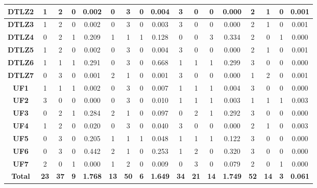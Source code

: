 \begin{table*}[t]
\begin{tabular}{c|c|c|c|c|c|c|c|c|c|c|c|c|c|c|c|c|}
\multicolumn{1}{|c|}{\textbf{DTLZ2}} & 1 & 2 & 0 & 0.002 & 0 & 3 & 0 & 0.004 & 3 & 0 & 0 & 0.000 & 2 & 1 & 0 & 0.001 \\ \hline
\multicolumn{1}{|c|}{\textbf{DTLZ3}} & 1 & 2 & 0 & 0.002 & 0 & 3 & 0 & 0.003 & 3 & 0 & 0 & 0.000 & 2 & 1 & 0 & 0.001 \\ \hline
\multicolumn{1}{|c|}{\textbf{DTLZ4}} & 0 & 2 & 1 & 0.209 & 1 & 1 & 1 & 0.128 & 0 & 0 & 3 & 0.334 & 2 & 0 & 1 & 0.000 \\ \hline
\multicolumn{1}{|c|}{\textbf{DTLZ5}} & 1 & 2 & 0 & 0.002 & 0 & 3 & 0 & 0.004 & 3 & 0 & 0 & 0.000 & 2 & 1 & 0 & 0.001 \\ \hline
\multicolumn{1}{|c|}{\textbf{DTLZ6}} & 1 & 1 & 1 & 0.291 & 0 & 3 & 0 & 0.668 & 1 & 1 & 1 & 0.299 & 3 & 0 & 0 & 0.000 \\ \hline
\multicolumn{1}{|c|}{\textbf{DTLZ7}} & 0 & 3 & 0 & 0.001 & 2 & 1 & 0 & 0.001 & 3 & 0 & 0 & 0.000 & 1 & 2 & 0 & 0.001 \\ \hline
\multicolumn{1}{|c|}{\textbf{UF1}} & 1 & 1 & 1 & 0.002 & 0 & 3 & 0 & 0.007 & 1 & 1 & 1 & 0.004 & 3 & 0 & 0 & 0.000 \\ \hline
\multicolumn{1}{|c|}{\textbf{UF2}} & 3 & 0 & 0 & 0.000 & 0 & 3 & 0 & 0.010 & 1 & 1 & 1 & 0.003 & 1 & 1 & 1 & 0.003 \\ \hline
\multicolumn{1}{|c|}{\textbf{UF3}} & 0 & 2 & 1 & 0.284 & 2 & 1 & 0 & 0.097 & 0 & 2 & 1 & 0.292 & 3 & 0 & 0 & 0.000 \\ \hline
\multicolumn{1}{|c|}{\textbf{UF4}} & 1 & 2 & 0 & 0.020 & 0 & 3 & 0 & 0.040 & 3 & 0 & 0 & 0.000 & 2 & 1 & 0 & 0.003 \\ \hline
\multicolumn{1}{|c|}{\textbf{UF5}} & 0 & 3 & 0 & 0.205 & 1 & 1 & 1 & 0.048 & 1 & 1 & 1 & 0.122 & 3 & 0 & 0 & 0.000 \\ \hline
\multicolumn{1}{|c|}{\textbf{UF6}} & 0 & 3 & 0 & 0.442 & 2 & 1 & 0 & 0.253 & 1 & 2 & 0 & 0.320 & 3 & 0 & 0 & 0.000 \\ \hline
\multicolumn{1}{|c|}{\textbf{UF7}} & 2 & 0 & 1 & 0.000 & 1 & 2 & 0 & 0.009 & 0 & 3 & 0 & 0.079 & 2 & 0 & 1 & 0.000 \\ \hline
\multicolumn{1}{|c|}{\textbf{Total}} & \textbf{23} & \textbf{37} & \textbf{9} & \textbf{1.768} & \textbf{13} & \textbf{50} & \textbf{6} & \textbf{1.649} & \textbf{34} & \textbf{21} & \textbf{14} & \textbf{1.749} & \textbf{52} & \textbf{14} & \textbf{3} & \textbf{0.061} \\ \hline
\end{tabular}%
\end{table*}


